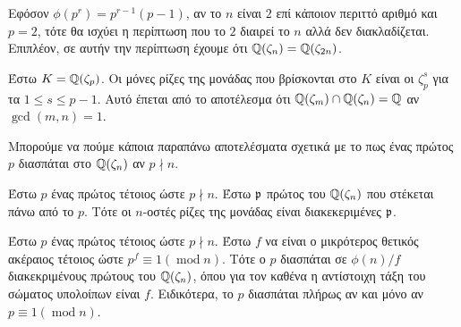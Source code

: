 \begin{remark}
	Εφόσον $\phi(p^r) = p^{r-1}(p-1)$, αν το $n$ είναι $2$ επί κάποιον περιττό αριθμό και $p=2$, τότε θα ισχύει η περίπτωση που το 
	$2$ διαιρεί το $n$ αλλά δεν διακλαδίζεται. Επιπλέον, σε αυτήν την περίπτωση έχουμε ότι $\mathbb{Q}(\zeta_n) = \mathbb{Q}(\zeta_{2n})$.
\end{remark}

\begin{remark} Έστω $K = \mathbb{Q}(\zeta_p)$. Οι μόνες ρίζες της μονάδας που βρίσκονται στο $K$ είναι οι $\zeta_p^s$ για τα $1\leq s \leq p-1$. 
	Αυτό έπεται από το αποτέλεσμα ότι $\mathbb{Q}(\zeta_m)\cap \mathbb{Q}(\zeta_n) = \mathbb{Q}$ αν $\gcd(m,n) =1 $.
\end{remark}


\noindent Μπορούμε να πούμε κάποια παραπάνω αποτελέσματα σχετικά με το πως ένας πρώτος $p$ διασπάται στο $\mathbb{Q}(\zeta_n)$ αν $p\nmid n$.

\begin{lemma} Έστω $p$ ένας πρώτος τέτοιος ώστε $p\nmid n$. Έστω $\mathfrak{p}$ πρώτος του $\mathbb{Q}(\zeta_n)$ που στέκεται πάνω από το $p$. Τότε οι $n$-οστές ρίζες της μονάδας είναι διακεκεριμένες  $\mathfrak{p}$.
\end{lemma}

\begin{lemma} Έστω $p$ ένας πρώτος τέτοιος ώστε $p\nmid n$. Έστω $f$ να είναι ο μικρότερος θετικός ακέραιος τέτοιος ώστε $p^f \equiv 1 (\operatorname{mod}n)$. Τότε ο $p$ διασπάται σε $\phi(n)/f$ διακεκριμένους πρώτους του $\mathbb{Q}(\zeta_n)$, όπου για τον καθένα η αντίστοιχη τάξη του σώματος υπολοίπων είναι $f$. Ειδικότερα, το $p$ διασπάται πλήρως αν και μόνο αν $p\equiv 1 (\operatorname{mod}n)$.
\end{lemma}